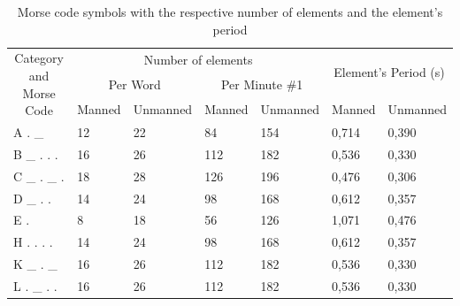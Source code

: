 \begin{table}[!htb]
\centering
\caption[Morse code symbols with the respective number of elements and the element's period]{Morse code symbols with the respective number of elements and the element's period}
\label{tab:morsefrequency1}
\begin{tabular}{@{}lllllll@{}}
\toprule
\multicolumn{1}{c}{\multirow{3}{*}{Category and Morse Code}} & \multicolumn{4}{c}{Number of elements}                        & \multicolumn{2}{c}{\multirow{2}{*}{Element's Period (s)}} \\ \cmidrule(lr){2-5}
                                         & \multicolumn{2}{c}{Per Word} & \multicolumn{2}{c}{Per Minute \#1} & \multicolumn{2}{c}{}                                      \\ \cmidrule(l){6-7} 
                                         & Manned       & Unmanned      & Manned        & Unmanned       & Manned                     & Unmanned                     \\ \cmidrule(r){1-1}
A . \_                                   & 12           & 22            & 84            & 154            & 0,714                      & 0,390                        \\
B \_ . . .                               & 16           & 26            & 112           & 182            & 0,536                      & 0,330                        \\
C \_ . \_ .                              & 18           & 28            & 126           & 196            & 0,476                      & 0,306                        \\
D \_ . .                                 & 14           & 24            & 98            & 168            & 0,612                      & 0,357                        \\
E .                                      & 8            & 18            & 56            & 126            & 1,071                      & 0,476                        \\
H . . . .                                & 14           & 24            & 98            & 168            & 0,612                      & 0,357                        \\
K \_ . \_                                & 16           & 26            & 112           & 182            & 0,536                      & 0,330                        \\
L . \_ . .                               & 16           & 26            & 112           & 182            & 0,536                      & 0,330                        \\

\end{tabular}
\end{table}
